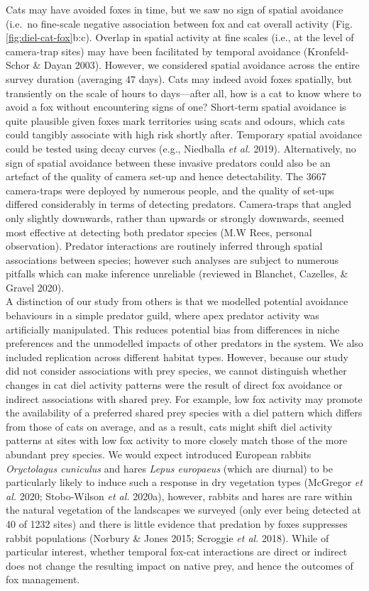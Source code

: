 \documentclass[11pt,a4paper,titlepage,twoside,openright]{style/unimelbthesis}
\begin{document}
\begin{mainmatter}
Cats may have avoided foxes in time, but we saw no sign of spatial avoidance (i.e.~no fine-scale negative association between fox and cat overall activity (Fig. \ref{fig:diel-cat-fox}b:c). Overlap in spatial activity at fine scales (i.e., at the level of camera-trap sites) may have been facilitated by temporal avoidance (Kronfeld-Schor \& Dayan 2003). However, we considered spatial avoidance across the entire survey duration (averaging 47 days). Cats may indeed avoid foxes spatially, but transiently on the scale of hours to days---after all, how is a cat to know where to avoid a fox without encountering signs of one? Short-term spatial avoidance is quite plausible given foxes mark territories using scats and odours, which cats could tangibly associate with high risk shortly after. Temporary spatial avoidance could be tested using decay curves (e.g., Niedballa \emph{et al.} 2019). Alternatively, no sign of spatial avoidance between these invasive predators could also be an artefact of the quality of camera set-up and hence detectability. The 3667 camera-traps were deployed by numerous people, and the quality of set-ups differed considerably in terms of detecting predators. Camera-traps that angled only slightly downwards, rather than upwards or strongly downwards, seemed most effective at detecting both predator species (M.W Rees, personal observation). Predator interactions are routinely inferred through spatial associations between species; however such analyses are subject to numerous pitfalls which can make inference unreliable (reviewed in Blanchet, Cazelles, \& Gravel 2020).\\
A distinction of our study from others is that we modelled potential avoidance behaviours in a simple predator guild, where apex predator activity was artificially manipulated. This reduces potential bias from differences in niche preferences and the unmodelled impacts of other predators in the system. We also included replication across different habitat types. However, because our study did not consider associations with prey species, we cannot distinguish whether changes in cat diel activity patterns were the result of direct fox avoidance or indirect associations with shared prey. For example, low fox activity may promote the availability of a preferred shared prey species with a diel pattern which differs from those of cats on average, and as a result, cats might shift diel activity patterns at sites with low fox activity to more closely match those of the more abundant prey species. We would expect introduced European rabbits \emph{Oryctolagus cuniculus} and hares \emph{Lepus europaeus} (which are diurnal) to be particularly likely to induce such a response in dry vegetation types (McGregor \emph{et al.} 2020; Stobo-Wilson \emph{et al.} 2020a), however, rabbits and hares are rare within the natural vegetation of the landscapes we surveyed (only ever being detected at 40 of 1232 sites) and there is little evidence that predation by foxes suppresses rabbit populations (Norbury \& Jones 2015; Scroggie \emph{et al.} 2018). While of particular interest, whether temporal fox-cat interactions are direct or indirect does not change the resulting impact on native prey, and hence the outcomes of fox management.


\end{mainmatter}
\end{document}
